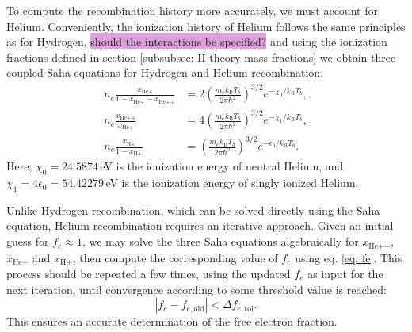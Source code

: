 \documentclass{aa}
\numberwithin{equation}{section}
\numberwithin{table}{section}
\numberwithin{figure}{section}
\begin{document}
To compute the recombination history more accurately, we must account for Helium. Conveniently, the ionization history of Helium follows the same principles as for Hydrogen, \colorbox{Plum}{should the interactions be specified?}
and using the ionization fractions defined in section \ref{subsubsec: II theory mass fractions} we obtain three coupled Saha equations for Hydrogen and Helium recombination:
\begin{align}
n_e \frac{x_{\text{He+}}}{1 - x_{\text{He+}} - x_{\text{He++}}} &= 2 \left( \frac{m_e k_\text{B}T_b}{2\pi\hbar^2} \right)^{3/2} e^{-\chi_0 / k_\text{B}T_b}, \\
n_e \frac{x_{\text{He++}}}{x_{\text{He+}}} &= 4 \left( \frac{m_e k_\text{B}T_b}{2\pi\hbar^2} \right)^{3/2} e^{-\chi_1 / k_\text{B}T_b}, \\
n_e \frac{x_{\text{H+}}}{1 - x_{\text{H+}}} &= \left( \frac{m_e k_\text{B}T_b}{2\pi\hbar^2} \right)^{3/2} e^{-\epsilon_0 / k_\text{B}T_b}.
\end{align}
Here, $\chi_0 = 24.5874\,$eV is the ionization energy of neutral Helium, and $\chi_1 = 4\epsilon_0 = 54.42279\,$eV is the ionization energy of singly ionized Helium.



Unlike Hydrogen recombination, which can be solved directly using the Saha equation, Helium recombination requires an iterative approach. Given an initial guess for $ f_e \approx 1 $, we may solve the three Saha equations algebraically for $x_{\text{He++}}$, $x_{\text{He+}}$ and $x_{\text{H+}}$, then compute the corresponding value of $f_e$ using eq. \eqref{eq: fe}. This process should be repeated a few times, using the updated $f_e$ as input for the next iteration, until convergence according to some threshold value is reached:
\begin{equation}
  |f_e - f_{e,\text{old}} | < \Delta f_{e,\text{tol}}.
\end{equation}
This ensures an accurate determination of the free electron fraction.
\end{document}
